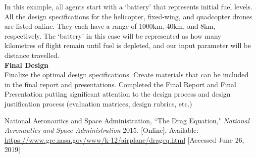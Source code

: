 \documentclass[../CourseManual.tex]{subfiles}
\begin{document}
In this example, all agents start with a `battery' that represents initial fuel levels. All the design specifications for the helicopter, fixed-wing, and quadcopter drones are listed online. They each have a range of 1000km, 40km, and 8km, respectively. The `battery' in this case will be represented as how many kilometres of flight remain until fuel is depleted, and our input parameter will be distance travelled. \\

\textbf{Final Design}\\
Finalize the optimal design specifications. Create materials that can be included in the final report and presentations. Completed the Final Report and Final Presentation putting significant attention to the design process and design justification process (evaluation matrices, design rubrics, etc.)

\newpage
{}
\begin{thebibliography}{}
National Aeronautics and Space Administration, ``The Drag Equation," \textit{National Aeronautics and Space Administration}
2015. [Online]. Available: \url{https://www.grc.nasa.gov/www/k-12/airplane/drageq.html} [Accessed June 26, 2019]

\end{thebibliography}
\end{document}
